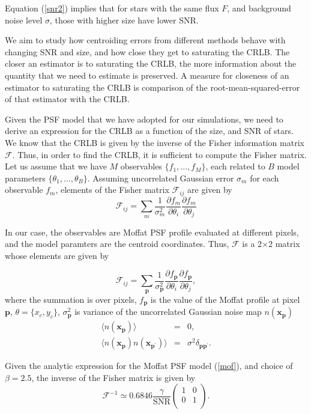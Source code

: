 \documentclass[12pt, preprint]{aastex}
\newcommand{\beq}{\begin{equation}}
\newcommand{\eeq}{\end{equation}}
\begin{document}
Equation (\ref{snr2}) implies that for stars with the same flux $F$,
 and background
noise level $\sigma$, those with higher size have lower SNR.

We aim to study how centroiding errors from different methods behave with
changing SNR and size, and how close they get to saturating the CRLB. 
The closer an estimator is to saturating the CRLB, the more information
 about the quantity that we 
need to estimate is preserved. A measure for closeness of an estimator to 
saturating the CRLB is comparison of the root-mean-squared-error of that estimator 
with the CRLB.

Given the PSF model that we have adopted for our simulations, we need 
to derive an expression for the CRLB as a function of the size, and SNR of stars.
 We know that the CRLB is given by the inverse of 
the Fisher information matrix $\mathcal{F}$. Thus, in order to find the CRLB,
 it is sufficient to compute the Fisher matrix.
Let us assume that we have $M$ observables $\{f_{1}, ... , f_{M}\}$, each
related to $B$ model parameters $\{\theta_{1} , ... , \theta_{B}\}$. Assuming
uncorrelated Gaussian error $\sigma_{m}$ for each observable $f_{m}$, elements
of the Fisher matrix $\mathcal{F}_{ij}$ are given by
\beq
\mathcal{F}_{ij} = \sum_{m}\frac{1}{\sigma_{m}^{2}}\frac{\partial f_{m}}{\partial \theta_{i}}\frac{\partial f_{m}}{\partial \theta_{j}}
\label{fisher}
\eeq

In our case, the observables are Moffat PSF profile evaluated at different pixels, and  
the model paramters are the centroid coordinates. Thus, $\mathcal{F}$
is a 2$\times$2 matrix whose elements are given by

\beq
  \mathcal{F}_{ij} = \sum_{\mathbf{p}}\frac{1}{\sigma_{\mathbf{p}}^{2}}
                \frac{\partial f_{\mathbf{p}}}{\partial \theta_{i}}\frac{\partial f_{\mathbf{p}}}{\partial \theta_{j}},
\label{fish}
\eeq
where the summation is over pixels, $f_{\mathbf{p}}$ is the value of the Moffat profile at pixel $\mathbf{p}$,
$\theta=\{x_{c},y_{c}\}$, $\sigma_{\mathbf{p}}^{2}$ is variance
of the uncorrelated Gaussian noise map $n(\mathbf{x_{p}})$
\begin{eqnarray}
\langle n(\mathbf{x_{p}}) \rangle &=& 0, \\
\langle n(\mathbf{x_{p}})n(\mathbf{x_{p^{\prime}}}) \rangle &=& \sigma^{2}\delta_{\mathbf{p}\mathbf{p}^{\prime}}. 
\end{eqnarray}

Given the analytic expression for the Moffat PSF model (\ref{mof}), and choice of $\beta=2.5$, 
the inverse of the Fisher matrix is given by
\beq
  \mathcal{F}^{-1} \simeq 0.6846 \frac{\gamma}{\text{SNR}} 
  \begin{pmatrix}
      1 & 0\\
      0 & 1\\
  \end{pmatrix}.
\label{crlbmoffat}
\eeq
\end{document}
